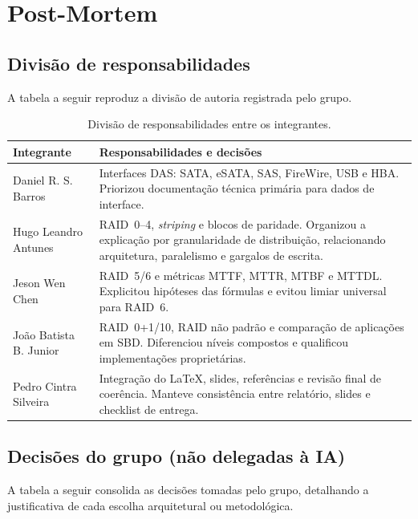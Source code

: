\documentclass[titlepage]{article}
\begin{document}
\section{Post-Mortem}
\label{sec:postmortem}

\subsection{Divisão de responsabilidades}
A tabela a seguir reproduz a divisão de autoria registrada pelo grupo.
\begin{table}[H]
    \centering
    \renewcommand{\arraystretch}{1.5}
    \begin{tabularx}{\textwidth}{|l|X|}
        \hline
        \textbf{Integrante} & \textbf{Responsabilidades e decisões} \\
        \hline
        Daniel R. S. Barros & Interfaces DAS: SATA, eSATA, SAS, FireWire, USB e HBA. Priorizou documentação técnica primária para dados de interface. \\
        \hline
        Hugo Leandro Antunes & RAID~0--4, \textit{striping} e blocos de paridade. Organizou a explicação por granularidade de distribuição, relacionando arquitetura, paralelismo e gargalos de escrita. \\
        \hline
        Jeson Wen Chen & RAID~5/6 e métricas MTTF, MTTR, MTBF e MTTDL. Explicitou hipóteses das fórmulas e evitou limiar universal para RAID~6. \\
        \hline
        João Batista B. Junior & RAID~0+1/10, RAID não padrão e comparação de aplicações em SBD. Diferenciou níveis compostos e qualificou implementações proprietárias. \\
        \hline
        Pedro Cintra Silveira & Integração do \LaTeX{}, slides, referências e revisão final de coerência. Manteve consistência entre relatório, slides e checklist de entrega. \\
        \hline
    \end{tabularx}
    \caption{Divisão de responsabilidades entre os integrantes.}
    \label{tab:autoria}
\end{table}

\subsection{Decisões do grupo (não delegadas à IA)}
A tabela a seguir consolida as decisões tomadas pelo grupo, detalhando a justificativa de cada escolha arquitetural ou metodológica.
\end{document}
